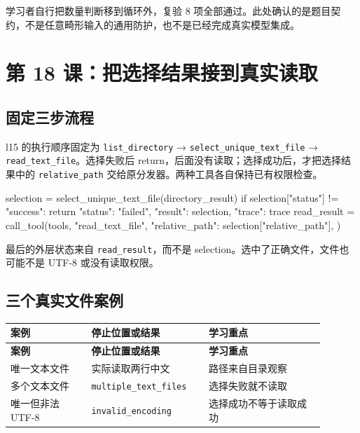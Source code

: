 学习者自行把数量判断移到循环外，复验 8 项全部通过。此处确认的是题目契约，不是任意畸形输入的通用防护，也不是已经完成真实模型集成。

\section{第 18 课：把选择结果接到真实读取}

\subsection{固定三步流程}

l15 的执行顺序固定为 \nolinkurl{list_directory} → \nolinkurl{select_unique_text_file} → \nolinkurl{read_text_file}。选择失败后 return，后面没有读取；选择成功后，才把选择结果中的 \nolinkurl{relative_path} 交给原分发器。两种工具各自保持已有权限检查。

\begin{Code}
selection = select_unique_text_file(directory_result)
if selection["status"] != "success":
    return {"status": "failed", "result": selection, "trace": trace}
read_result = call_tool(tools, "read_text_file", {
    "relative_path": selection["relative_path"],
})
\end{Code}

最后的外层状态来自 \nolinkurl{read_result}，而不是 selection。选中了正确文件，文件也可能不是 UTF-8 或没有读取权限。

\subsection{三个真实文件案例}

{\small\setlength{\tabcolsep}{4pt}
\renewcommand{\arraystretch}{1.25}
\begin{longtable}{>{\raggedright\arraybackslash}p{0.23\linewidth}>{\raggedright\arraybackslash}p{0.33\linewidth}>{\raggedright\arraybackslash}p{0.33\linewidth}}
\toprule
\textbf{案例} & \textbf{停止位置或结果} & \textbf{学习重点} \\
\midrule\endfirsthead
\toprule
\textbf{案例} & \textbf{停止位置或结果} & \textbf{学习重点} \\
\midrule\endhead
\bottomrule\endfoot
唯一文本文件 & 实际读取两行中文 & 路径来自目录观察 \\
多个文本文件 & \nolinkurl{multiple_text_files} & 选择失败就不读取 \\
唯一但非法 UTF-8 & \nolinkurl{invalid_encoding} & 选择成功不等于读取成功 \\
\end{longtable}}


